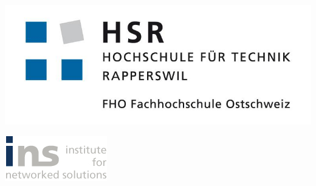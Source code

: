 

\begin{titlepage}

\begin{center}
\begin{minipage}[t]{0.45\textwidth}
    \includegraphics[width=\textwidth]{start/img/hsrLogo.jpg}
\end{minipage}
\hspace{\fill} %
\begin{minipage}[t]{0.35\textwidth}
    \vspace{-2.56cm}
    \includegraphics[width=\textwidth]{start/img/insLogo.jpg}
\end{minipage}

\end{center}

\vspace{15ex} %
\begin{center}
	\Huge 
	\begin{framed}
		\textbf{\titel}
	\end{framed}
	
	\vspace{3ex}
	\textbf{\work}
	

\end{center}
\end{titlepage}
